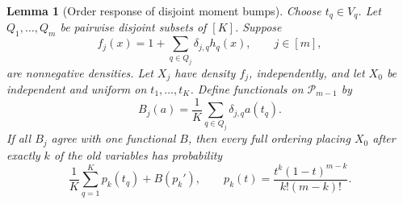 \documentclass[11pt]{article}
\newtheorem{lemma}[theorem]{Lemma}
\newcommand{\PP}{\mathcal P}
\begin{document}
\begin{lemma}[Order response of disjoint moment bumps]\label{lem:response}
Choose $t_q\in V_q$. Let $Q_1,\ldots,Q_m$ be pairwise disjoint subsets
of $[K]$. Suppose
\[
 f_j(x)=1+\sum_{q\in Q_j}\delta_{j,q}h_q(x),\qquad j\in[m],
\]
are nonnegative densities. Let $X_j$ have density $f_j$, independently,
and let $X_0$ be independent and uniform on $t_1,\ldots,t_K$.
Define functionals on $\PP_{m-1}$ by
\[
 B_j(a)=\frac1K\sum_{q\in Q_j}\delta_{j,q}a(t_q).
\]
If all $B_j$ agree with one functional $B$, then every full ordering
placing $X_0$ after exactly $k$ of the old variables has probability
\begin{equation}\label{eq:response}
 \frac1K\sum_{q=1}^Kp_k(t_q)+B(p_k'),\qquad
 p_k(t)=\frac{t^k(1-t)^{m-k}}{k!(m-k)!}.
\end{equation}
\end{lemma}
\end{document}
